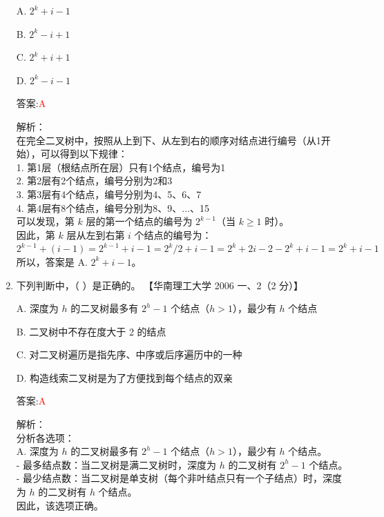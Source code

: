 \documentclass[lang=cn,newtx,10pt,scheme=chinese]{../../../elegantbook}
\begin{document}
\begin{enumerate}
    A. $2^k + i - 1$  

    B. $2^{k} - i + 1$  

    C. $2^k + i + 1$  

    D. $2^{k} - i - 1$  

    答案:\textcolor{red}{A}
    
    解析：\\
    在完全二叉树中，按照从上到下、从左到右的顺序对结点进行编号（从1开始），可以得到以下规律：\\
    1. 第1层（根结点所在层）只有1个结点，编号为1\\
    2. 第2层有2个结点，编号分别为2和3\\
    3. 第3层有4个结点，编号分别为4、5、6、7\\
    4. 第4层有8个结点，编号分别为8、9、...、15\\
    
    可以发现，第 $k$ 层的第一个结点的编号为 $2^{k-1}$（当 $k \geq 1$ 时）。\\
    因此，第 $k$ 层从左到右第 $i$ 个结点的编号为：$2^{k-1} + (i-1) = 2^{k-1} + i - 1 = 2^k/2 + i - 1 = 2^k + 2i - 2 - 2^k + i - 1 = 2^k + i - 1$\\
    
    所以，答案是 A. $2^k + i - 1$。\\


    \item 下列判断中，（ ）是正确的。  
    【华南理工大学 2006 一、2（2 分）】  

    A. 深度为 $h$ 的二叉树最多有 $2^h - 1$ 个结点（$h > 1$），最少有 $h$ 个结点  

    B. 二叉树中不存在度大于 2 的结点  

    C. 对二叉树遍历是指先序、中序或后序遍历中的一种  

    D. 构造线索二叉树是为了方便找到每个结点的双亲  

    答案:\textcolor{red}{A}
    
    解析：\\
    分析各选项：\\
    
    A. 深度为 $h$ 的二叉树最多有 $2^h - 1$ 个结点（$h > 1$），最少有 $h$ 个结点。\\
    - 最多结点数：当二叉树是满二叉树时，深度为 $h$ 的二叉树有 $2^h - 1$ 个结点。\\
    - 最少结点数：当二叉树是单支树（每个非叶结点只有一个子结点）时，深度为 $h$ 的二叉树有 $h$ 个结点。\\
    因此，该选项正确。\\
    

\end{enumerate}
\end{document}
